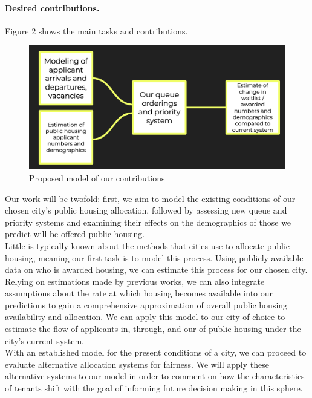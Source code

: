\documentclass[11pt]{article}
\begin{document}
\paragraph{Desired contributions.}
Figure 2 shows the main tasks and contributions.
\begin{figure}
    \centering
    \includegraphics[width=0.75\linewidth]{ourmodel.png}
    \caption{Proposed model of our contributions}
    \label{fig:enter-label}
\end{figure}
Our work will be twofold: first, we aim to model the existing conditions of our chosen city's public housing allocation, followed by assessing new queue and priority systems and examining their effects on the demographics of those we predict will be offered public housing. \\
\newline
Little is typically known about the methods that cities use to allocate public housing, meaning our first task is to model this process. Using publicly available data on who is awarded housing, we can estimate this process for our chosen city. Relying on estimations made by previous works, we can also integrate assumptions about the rate at which housing becomes available into our predictions to gain a comprehensive approximation of overall public housing availability and allocation. We can apply this model to our city of choice to estimate the flow of applicants in, through, and our of public housing under the city's current system. \\
\newline
With an established model for the present conditions of a city, we can proceed to evaluate alternative allocation systems for fairness. We will apply these alternative systems to our model in order to comment on how the characteristics of tenants shift with the goal of informing future decision making in this sphere.
\end{document}
